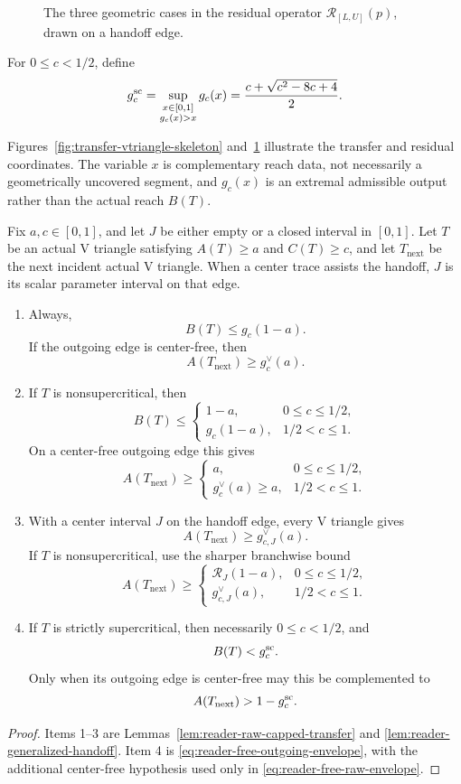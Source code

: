 \begin{figure}[H]
\centering
\resizebox{.99\linewidth}{!}{}
\caption{The three geometric cases in the residual operator
$\mathcal R_{[L,U]}(p)$, drawn on a handoff edge.}
\label{fig:transfer-residual-skeleton}
\end{figure}

\begin{definition}
\label{def:body-supercritical-envelope}
For $0\le c<1/2$, define
\[
 g_c^{\rm sc}
 =\sup_{\substack{x\in[0,1]\\g_c(x)>x}}g_c(x)
 =\frac{c+\sqrt{c^2-8c+4}}2.
\]
\end{definition}

Figures~\ref{fig:transfer-vtriangle-skeleton}
and~\ref{fig:transfer-residual-skeleton} illustrate the transfer and residual
coordinates.  The variable $x$ is complementary reach data, not necessarily
a geometrically uncovered segment, and $g_c(x)$ is an extremal admissible
output rather than the actual reach $B(T)$.

\begin{proposition}
\label{prop:body-transfer-interface}
Fix $a,c\in[0,1]$, and let $J$ be either empty or a closed interval in
$[0,1]$.  Let $T$ be an actual V triangle satisfying $A(T)\ge a$ and
$C(T)\ge c$, and let $T_{\mathrm{next}}$ be the next incident actual V
triangle.  When a center trace assists the handoff, $J$ is its scalar
parameter interval on that edge.
\begin{enumerate}
\item Always,
\[
 B(T)\le g_c(1-a).
\]
If the outgoing edge is center-free, then
\[
 A(T_{\mathrm{next}})\ge g_c^\vee(a).
\]
\item If $T$ is nonsupercritical, then
\[
 B(T)\le
 \begin{cases}
 1-a,&0\le c\le1/2,\\
 g_c(1-a),&1/2<c\le1.
 \end{cases}
\]
On a center-free outgoing edge this gives
\[
 A(T_{\mathrm{next}})\ge
 \begin{cases}
 a,&0\le c\le1/2,\\
 g_c^\vee(a)\ge a,&1/2<c\le1.
 \end{cases}
\]
\item With a center interval $J$ on the handoff edge, every V triangle gives
\[
 A(T_{\mathrm{next}})\ge g_{c,J}^\vee(a).
\]
If $T$ is nonsupercritical, use the sharper branchwise bound
\[
 A(T_{\mathrm{next}})\ge
 \begin{cases}
 \mathcal R_J(1-a),&0\le c\le1/2,\\
 g_{c,J}^\vee(a),&1/2<c\le1.
 \end{cases}
\]
\item If $T$ is strictly supercritical, then necessarily $0\le c<1/2$, and
\[
 B(T)<g_c^{\rm sc}.
\]
Only when its outgoing edge is center-free may this be complemented to
\[
 A(T_{\mathrm{next}})>1-g_c^{\rm sc}.
\]
\end{enumerate}
\end{proposition}

\begin{proof}
Items 1--3 are Lemmas~\ref{lem:reader-raw-capped-transfer} and
\ref{lem:reader-generalized-handoff}.  Item 4 is
\eqref{eq:reader-free-outgoing-envelope}, with the additional center-free
hypothesis used only in \eqref{eq:reader-free-raw-envelope}.
\end{proof}
